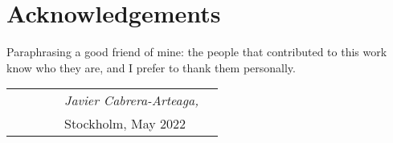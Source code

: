 \section*{Acknowledgements}

Paraphrasing a good friend of mine: the people that contributed to this work know who they are, and I prefer to thank them personally.




\begin{table}[hb]
\begin{tabular}{lp{6.67cm}llll}
& & & & \textit{Javier Cabrera-Arteaga,} \\
& & & & Stockholm, May 2022
\end{tabular}
\end{table}





